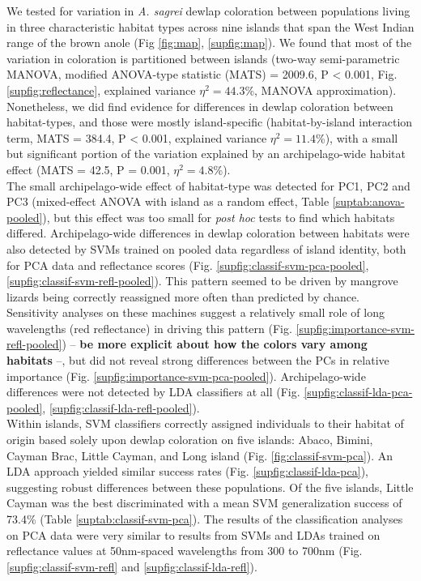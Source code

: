 
We tested for variation in \textit{A. sagrei} dewlap coloration between populations living in three characteristic habitat types across nine islands that span the West Indian range of the brown anole (Fig \ref{fig:map}, \ref{supfig:map}). We found that most of the variation in coloration is partitioned between islands (two-way semi-parametric MANOVA, modified ANOVA-type statistic (MATS) = 2009.6, P < 0.001, Fig. \ref{supfig:reflectance}, explained variance $\eta^2 = 44.3$\%, MANOVA approximation). Nonetheless, we did find evidence for differences in dewlap coloration between habitat-types, and those were mostly island-specific (habitat-by-island interaction term, MATS = 384.4, P < 0.001, explained variance $\eta^2 = 11.4$\%), with a small but significant portion of the variation explained by an archipelago-wide habitat effect (MATS = 42.5, P = 0.001, $\eta^2 = 4.8$\%).\\

The small archipelago-wide effect of habitat-type was detected for PC1, PC2 and PC3 (mixed-effect ANOVA with island as a random effect, Table \ref{suptab:anova-pooled}), but this effect was too small for \textit{post hoc} tests to find which habitats differed. Archipelago-wide differences in dewlap coloration between habitats were also detected by SVMs trained on pooled data regardless of island identity, both for PCA data and reflectance scores (Fig. \ref{supfig:classif-svm-pca-pooled}, \ref{supfig:classif-svm-refl-pooled}). This pattern seemed to be driven by mangrove lizards being correctly reassigned more often than predicted by chance. Sensitivity analyses on these machines suggest a relatively small role of long wavelengths (red reflectance) in driving this pattern (Fig. \ref{supfig:importance-svm-refl-pooled}) -- \textbf{be more explicit about how the colors vary among habitats} --, but did not reveal strong differences between the PCs in relative importance (Fig. \ref{supfig:importance-svm-pca-pooled}).  Archipelago-wide differences were not detected by LDA classifiers at all (Fig. \ref{supfig:classif-lda-pca-pooled}, \ref{supfig:classif-lda-refl-pooled}).\\ %

Within islands, SVM classifiers correctly assigned individuals to their habitat of origin based solely upon dewlap coloration on five islands: Abaco, Bimini, Cayman Brac, Little Cayman, and Long island (Fig. \ref{fig:classif-svm-pca}). An LDA approach yielded similar success rates (Fig. \ref{supfig:classif-lda-pca}), suggesting robust differences between these populations. Of the five islands, Little Cayman was the best discriminated with a mean SVM generalization success of 73.4\% (Table \ref{suptab:classif-svm-pca}). The results of the classification analyses on PCA data were very similar to results from SVMs and LDAs trained on reflectance values at 50nm-spaced wavelengths from 300 to 700nm (Fig. \ref{supfig:classif-svm-refl} and \ref{supfig:classif-lda-refl}).\\

